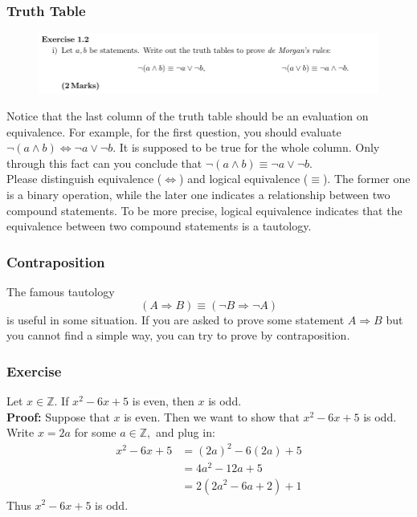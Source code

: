 \documentclass[10pt, t]{beamer}
\newcommand{\nullspace}{~\\[15pt]}
\begin{document}
\begin{frame}
    \frametitle{Truth Table}
    \begin{figure}[H]
        \centering
        \includegraphics[width=\textwidth]{2020-10-17-23-11-31.png}
    \end{figure}

    Notice that the last column of the truth table should be an evaluation on equivalence. For example, for the first question, you should evaluate $\neg(a \wedge b)\Leftrightarrow \neg a \vee \neg b$. It is supposed to be true for the whole column. Only through this fact can you conclude that $\neg(a \wedge b)\equiv \neg a \vee \neg b$.\nullspace
    Please distinguish equivalence ($\Leftrightarrow$) and logical equivalence ($\equiv$). The former one is a binary operation, while the later one indicates a relationship between two compound statements. To be more precise, logical equivalence indicates that the equivalence between two compound statements is a tautology.

\end{frame}

\begin{frame}
    \frametitle{Contraposition}

    The famous tautology
    $$(A \Rightarrow B) \equiv(\neg B \Rightarrow \neg A)$$ is useful in some situation. If you are asked to prove some statement $A\Rightarrow B$ but you cannot find a simple way, you can try to prove by contraposition.

\end{frame}

\begin{frame}
    \frametitle{Exercise}

    Let $x \in \mathbb{Z} .$ If $x^{2}-6 x+5$ is even, then $x$ is odd.\nullspace\pause
    \textbf{Proof:} 
    Suppose that $x$ is even. Then we want to show that $x^{2}-6 x+5$ is odd. Write $x=2 a$ for some $a \in \mathbb{Z},$ and plug in:
    $$
        \begin{aligned}
            x^{2}-6 x+5 & =(2 a)^{2}-6(2 a)+5            \\
                        & =4 a^{2}-12 a+5                \\
                        & =2\left(2 a^{2}-6 a+2\right)+1
        \end{aligned}
    $$
    Thus $x^{2}-6 x+5$ is odd.

\end{frame}
\end{document}

